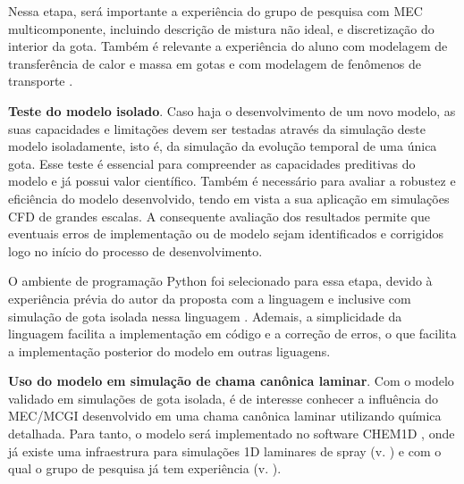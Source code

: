 Nessa etapa, será importante a experiência do grupo de pesquisa com MEC multicomponente, incluindo descrição de mistura não ideal, e discretização do interior da gota.
Também é relevante a experiência do aluno com modelagem de transferência de calor e massa em gotas \cite{HenningsJ2024MT} e com modelagem de fenômenos de transporte \cite{HenningsJ2023BT,ToniniS2015IJTS,ToniniS2016IJHMT,DeBroeckL2025}. %

\textbf{Teste do modelo isolado}.
Caso haja o desenvolvimento de um novo modelo, as suas capacidades e limitações devem ser testadas através da simulação deste modelo isoladamente, isto é, da simulação da evolução temporal de uma única gota.
Esse teste é essencial para compreender as capacidades preditivas do modelo e já possui valor científico. Também é necessário para avaliar a robustez e eficiência do modelo desenvolvido, tendo em vista a sua aplicação em simulações CFD de grandes escalas.
A consequente avaliação dos resultados permite que eventuais erros de implementação ou de modelo sejam identificados e corrigidos logo no início do processo de desenvolvimento.

O ambiente de programação Python foi selecionado para essa etapa, devido à experiência prévia do autor da proposta com a linguagem e inclusive com simulação de gota isolada nessa linguagem \cite{HenningsJ2024MT}.
Ademais, a simplicidade da linguagem facilita a implementação em código e a correção de erros, o que facilita a implementação posterior do modelo em outras liguagens.

\textbf{Uso do modelo em simulação de chama canônica laminar}.
Com o modelo validado em simulações de gota isolada, é de interesse conhecer a influência do MEC/MCGI desenvolvido em uma chama canônica laminar utilizando química detalhada.
Para tanto, o modelo será implementado no software CHEM1D \cite{Sommers1994PhD}, onde já existe uma infraestrura para simulações 1D laminares de spray (v. \cite{Sommers1994PhD,vanOijen2002CTM,vanOijen2016PECS, SacomanoF2018CTM,SacomanoF2021Fluids}) e com o qual o grupo de pesquisa já tem experiência (v. \cite{SacomanoF2018CTM,SacomanoF2019IJHMT,SacomanoF2021Fluids,SacomanoF2024CF,SacomanoF2025CF}).

